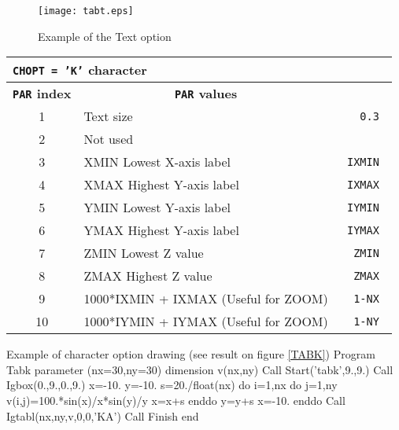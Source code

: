 \vfill
\clearpage

\begin{figure}[p]
\begin{center} \texttt{[image: tabt.eps]} \end{center}
\caption{Example of the \protect{} Text option}
\label{TABT}
\end{figure}

\vfill
\clearpage

\begin{center}
\begin{tabular}{||c|p{11cm}|>{\tt}r||}
\hline
\multicolumn{3}{||l||}{\bf {\tt CHOPT = 'K'} character}     \\
\hline
\multicolumn{1}{||c|}{\bf {\tt PAR} index}        &
\multicolumn{1}{c|}{\bf {\tt PAR} values}         &
\multicolumn{1}{c||}{\bf default}                           \\
\hline
1  & Text size                                                      &   0.3   \\
2  & Not used                                                       &         \\
3  & XMIN Lowest X-axis label                                       &   IXMIN \\
4  & XMAX Highest Y-axis label                                      &   IXMAX \\
5  & YMIN Lowest Y-axis label                                       &   IYMIN \\
6  & YMAX Highest Y-axis label                                      &   IYMAX \\
7  & ZMIN Lowest Z value                                            &   ZMIN  \\
8  & ZMAX Highest Z value                                           &   ZMAX  \\
9  & 1000*IXMIN + IXMAX (Useful for ZOOM)                           &   1-NX  \\
10 & 1000*IYMIN + IYMAX (Useful for ZOOM)                           &   1-NY  \\
\hline
\end{tabular}
\end{center}

\bigskip

\begin{XMPt}{Example of character option drawing 
             (see result on figure \ref{TABK})}
      Program Tabk 
      parameter (nx=30,ny=30)
      dimension v(nx,ny)
      Call Start('tabk',9.,9.)
      Call Igbox(0.,9.,0.,9.)
      x=-10.
      y=-10.
      s=20./float(nx)
      do i=1,nx
         do j=1,ny
            v(i,j)=100.*sin(x)/x*sin(y)/y
            x=x+s
         enddo
         y=y+s
         x=-10.
      enddo
      Call Igtabl(nx,ny,v,0,0,'KA')
      Call Finish
      end
\end{XMPt}

